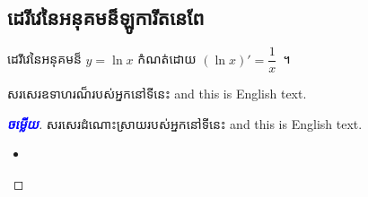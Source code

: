 \documentclass[a4paper,leqno,fleqn]{book}
\newcommand{\answer}{\textcolor{blue}{\bfseries ចម្លើយ}}
\begin{document}
	\subsection{ដេរីវេនៃអនុគមន៏ឡូការីតនេពែ}
	\vspace{1ex}
	\begin{multicols}{2}
	\begin{definition}{}{}
		ដេរីវេនៃអនុគមន៏ $ y=\ln x $ កំណត់ដោយ $ (\ln x)'=\dfrac{1}{x} $~។
	\end{definition}
	\begin{example}{}{}
		សរសេរឧទាហរណ៏របស់អ្នកនៅទីនេះ \textenglish{and this is English text.}
	\end{example}
	\end{multicols}
	\begin{proof}[\answer]
		សរសេរដំណោះស្រាយរបស់អ្នកនៅទីនេះ \textenglish{and this is English text.}
		\begin{itemize}
			\item 
		\end{itemize}
	\end{proof}
\end{document}
